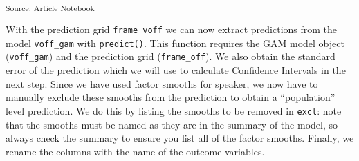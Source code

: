\documentclass[
  man,
  longtable,
  nolmodern,
  notxfonts,
  notimes,
  colorlinks=true,linkcolor=blue,citecolor=blue,urlcolor=blue]{apa7}
\newenvironment{Shaded}{\begin{snugshade}}{\end{snugshade}}
\newcommand{\AttributeTok}[1]{\textcolor[rgb]{0.40,0.45,0.13}{#1}}
\newcommand{\CommentTok}[1]{\textcolor[rgb]{0.37,0.37,0.37}{#1}}
\newcommand{\DecValTok}[1]{\textcolor[rgb]{0.68,0.00,0.00}{#1}}
\newcommand{\FloatTok}[1]{\textcolor[rgb]{0.68,0.00,0.00}{#1}}
\newcommand{\FunctionTok}[1]{\textcolor[rgb]{0.28,0.35,0.67}{#1}}
\newcommand{\NormalTok}[1]{\textcolor[rgb]{0.00,0.23,0.31}{#1}}
\newcommand{\OtherTok}[1]{\textcolor[rgb]{0.00,0.23,0.31}{#1}}
\newcommand{\SpecialCharTok}[1]{\textcolor[rgb]{0.37,0.37,0.37}{#1}}
\newcommand{\StringTok}[1]{\textcolor[rgb]{0.13,0.47,0.30}{#1}}
\begin{document}
\begin{Shaded}
\end{Shaded}

\textsubscript{Source:
\href{https://stefanocoretta.github.io/mv_uti/index.qmd.html}{Article
Notebook}}

With the prediction grid \texttt{frame\_voff} we can now extract
predictions from the model \texttt{voff\_gam} with \texttt{predict()}.
This function requires the GAM model object (\texttt{voff\_gam}) and the
prediction grid (\texttt{frame\_off}). We also obtain the standard error
of the prediction which we will use to calculate Confidence Intervals in
the next step. Since we have used factor smooths for speaker, we now
have to manually exclude these smooths from the prediction to obtain a
``population'' level prediction. We do this by listing the smooths to be
removed in \texttt{excl}: note that the smooths must be named as they
are in the summary of the model, so always check the summary to ensure
you list all of the factor smooths. Finally, we rename the columns with
the name of the outcome variables.
\end{document}
